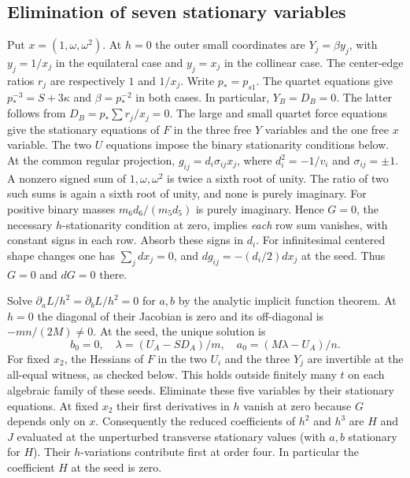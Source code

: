 \documentclass[11pt,letterpaper]{article}
\theoremstyle{definition}
\begin{document}
\subsection{Elimination of seven stationary variables}

Put $x=(1,\omega,\omega^2)$. At $h=0$ the outer small coordinates are
$Y_j=\beta y_j$, with $y_j=1/x_j$ in the equilateral case and $y_j=x_j$
in the collinear case. The center-edge ratios $r_j$ are respectively $1$ and
$1/x_j$. Write $p_*=p_{s1}$. The quartet equations
give $p_*^{-3}=S+3\kappa$ and $\beta=p_*^{-2}$ in both cases. In particular,
$Y_B=D_B=0$. The latter follows from $D_B=p_*\sum r_j/x_j=0$.
The large and small quartet force equations give the stationary equations of
$F$ in the three free $Y$ variables and the one free $x$ variable.
The two $U$ equations impose the binary stationarity conditions below.
At the common regular projection, $g_{ij}=d_i\sigma_{ij}x_j$, where $d_i^2=-1/v_i$ and $\sigma_{ij}=\pm1$. A nonzero signed sum of $1,\omega,\omega^2$ is twice a sixth root of unity. The ratio of two such sums is again a sixth root of unity, and none is purely imaginary. For positive binary masses $m_6d_6/(m_5d_5)$ is purely imaginary. Hence $G=0$, the necessary $h$-stationarity condition at zero, implies \emph{each} row sum vanishes, with constant signs in each row. Absorb these signs in $d_i$. For infinitesimal centered shape changes one has $\sum_j dx_j=0$, and $dg_{ij}=-(d_i/2)dx_j$ at the seed. Thus $G=0$ and $dG=0$ there.

Solve $\partial_aL/h^2=\partial_bL/h^2=0$ for $a,b$ by the analytic implicit function theorem. At $h=0$ the diagonal of their Jacobian is zero and its off-diagonal is $-mn/(2M)\ne0$. At the seed, the unique solution is
\[
b_0=0,\quad \lambda=(U_A-SD_A)/m,\quad a_0=(M\lambda-U_A)/n.
\]
For fixed $x_2$, the Hessians of $F$ in the two $U_i$ and the three $Y_j$ are invertible at the all-equal witness, as checked below. This holds outside finitely many $t$ on each algebraic family of these seeds. Eliminate these five variables by their stationary equations. At fixed $x_2$ their first derivatives in $h$ vanish at zero because $G$ depends only on $x$. Consequently the reduced coefficients of $h^2$ and $h^3$ are $H$ and $J$ evaluated at the unperturbed transverse stationary values (with $a,b$ stationary for $H$). Their $h$-variations contribute first at order four. In particular the coefficient $H$ at the seed is zero.
\end{document}
